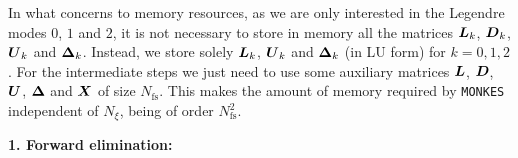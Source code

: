 \documentclass[10pt]{iopart}
\newcommand{\MONKES}{{\texttt{MONKES}}}
\begin{document}
In what concerns to memory resources, as we are only interested in the Legendre modes $0$, $1$ and $2$, it is not necessary to store in memory all the matrices $\vb*{L}_k$, $\vb*{D}_k$, $\vb*{U}_k$ and $\vb*{\Delta}_k$. Instead, we store solely $\vb*{L}_k$, $\vb*{U}_k$ and $\vb*{\Delta}_k$ (in LU form) for $k=0,1,2$. For the intermediate steps we just need to use some auxiliary matrices $\vb*{L}$, $\vb*{D}$, $\vb*{U}$, $\vb*{\Delta}$ and $\vb*{X}$ of size $N_{\text{fs}}$. This makes the amount of memory required by {\MONKES} independent of $N_\xi$, being of order $N_{\text{fs}}^2$.
\begin{algorithm} 
	\caption{Block tridiagonal solution algorithm implemented in {\MONKES}.}\label{alg:MONKES_BTD}		
	\textbf{1. Forward elimination:}
	\begin{algorithmic}%
		 
		  
		 
		
		 
		 
		
		    
		\EndIf
		\EndFor
		
		\State{}
		
		
		
		 
		 
		

\end{algorithmic}
\end{algorithm}
\end{document}
